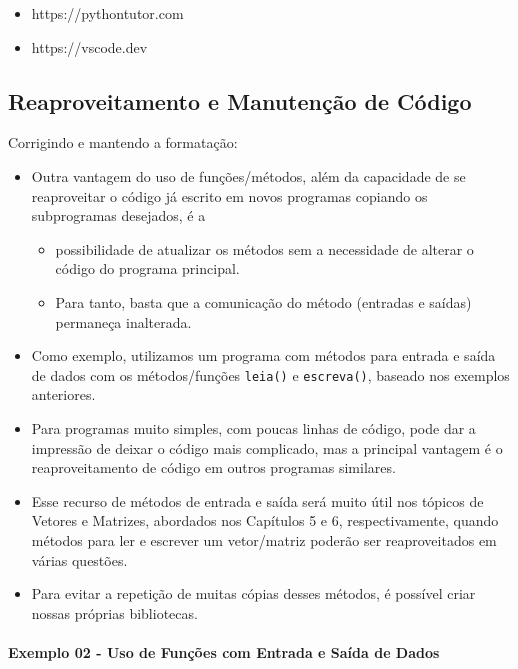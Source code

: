 \documentclass[12pt,a4paper]{article}
\providecommand{\tightlist}{%
      \setlength{\itemsep}{0pt}\setlength{\parskip}{0pt}}
\begin{document}
\begin{itemize}
\tightlist
\item
  https://pythontutor.com
\item
  https://vscode.dev
\end{itemize}

    \hypertarget{reaproveitamento-e-manutenuxe7uxe3o-de-cuxf3digo}{%
\subsection{Reaproveitamento e Manutenção de
Código}\label{reaproveitamento-e-manutenuxe7uxe3o-de-cuxf3digo}}

    Corrigindo e mantendo a formatação:

\begin{itemize}
\item
  Outra vantagem do uso de funções/métodos, além da capacidade de se
  reaproveitar o código já escrito em novos programas copiando os
  subprogramas desejados, é a

  \begin{itemize}
  \tightlist
  \item
    possibilidade de atualizar os métodos sem a necessidade de alterar o
    código do programa principal.
  \item
    Para tanto, basta que a comunicação do método (entradas e saídas)
    permaneça inalterada.
  \end{itemize}
\item
  Como exemplo, utilizamos um programa com métodos para entrada e saída
  de dados com os métodos/funções \texttt{leia()} e \texttt{escreva()},
  baseado nos exemplos anteriores.
\item
  Para programas muito simples, com poucas linhas de código, pode dar a
  impressão de deixar o código mais complicado, mas a principal vantagem
  é o reaproveitamento de código em outros programas similares.
\item
  Esse recurso de métodos de entrada e saída será muito útil nos tópicos
  de Vetores e Matrizes, abordados nos Capítulos 5 e 6, respectivamente,
  quando métodos para ler e escrever um vetor/matriz poderão ser
  reaproveitados em várias questões.
\item
  Para evitar a repetição de muitas cópias desses métodos, é possível
  criar nossas próprias bibliotecas.
\end{itemize}

    \hypertarget{exemplo-02---uso-de-funuxe7uxf5es-com-entrada-e-sauxedda-de-dados}{%
\paragraph{Exemplo 02 - Uso de Funções com Entrada e Saída de
Dados}\label{exemplo-02---uso-de-funuxe7uxf5es-com-entrada-e-sauxedda-de-dados}}
\end{document}
